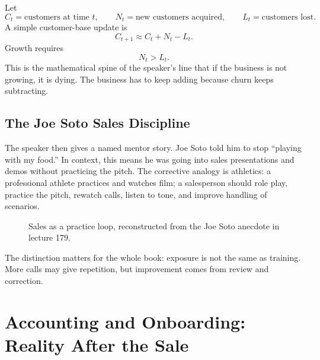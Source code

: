 \documentclass[11pt,oneside]{book}
\begin{document}
Let
\[
C_t=\text{customers at time }t,\qquad
N_t=\text{new customers acquired},\qquad
L_t=\text{customers lost}.
\]
A simple customer-base update is
\[
C_{t+1}\approx C_t+N_t-L_t.
\]
Growth requires
\[
N_t>L_t.
\]
This is the mathematical spine of the speaker's line that if the business is not growing, it is dying. The business has to keep adding because churn keeps subtracting.

\subsection{The Joe Soto Sales Discipline}

The speaker then gives a named mentor story. Joe Soto told him to stop ``playing with my food.'' In context, this means he was going into sales presentations and demos without practicing the pitch. The corrective analogy is athletics: a professional athlete practices and watches film; a salesperson should role play, practice the pitch, rewatch calls, listen to tone, and improve handling of scenarios.

\begin{figure}
\centering
{}
\caption{Sales as a practice loop, reconstructed from the Joe Soto anecdote in lecture 179.}
\end{figure}

The distinction matters for the whole book: exposure is not the same as training. More calls may give repetition, but improvement comes from review and correction.

\section{Accounting and Onboarding: Reality After the Sale}
\end{document}
